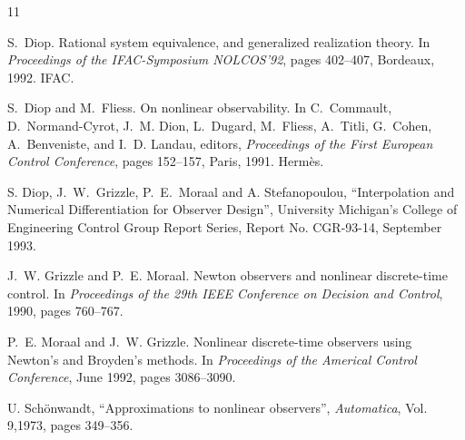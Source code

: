 \begin{thebibliography}{11}


S.~Diop.
\newblock Rational system equivalence, and generalized realization theory.
\newblock In {\em Proceedings of the {I}FAC-{S}ymposium {N}OLCOS'92}, pages
  402--407, Bordeaux, 1992. IFAC.

S.~Diop and M.~Fliess.
\newblock On nonlinear observability.
\newblock In C.~Commault, D.~Normand-Cyrot, J.~M. Dion, L.~Dugard, M.~Fliess,
  A.~Titli, G.~Cohen, A.~Benveniste, and I.~D. Landau, editors, {\em
  Proceedings of the {F}irst {E}uropean {C}ontrol {C}onference}, pages
  152--157, Paris, 1991. Herm{\`e}s.

S. Diop, J.\ W.\ Grizzle, 
P.\ E.\ Moraal and A. Stefanopoulou, ``Interpolation and Numerical 
Differentiation for Observer Design'', University Michigan's College of
Engineering Control Group Report Series,  Report No. CGR-93-14, September
1993.


J.~W. Grizzle and P.~E. Moraal.
\newblock Newton observers and nonlinear discrete-time control.
\newblock In {\em Proceedings of the 29th {I}EEE {C}onference on {D}ecision and
  {C}ontrol}, 1990, pages 760--767.

P.~E. Moraal and J.~W. Grizzle.
\newblock Nonlinear discrete-time observers using {N}ewton's and {B}royden's
  methods.
\newblock In {\em Proceedings of the {A}merical {C}ontrol {C}onference}, June
1992, pages 3086--3090.

U. Sch\"{o}nwandt, ``Approximations to nonlinear observers'', {\it Automatica},
Vol. 9,1973,  pages 349--356.

\end{thebibliography}






